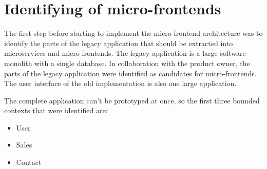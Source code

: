 \section{Identifying of micro-frontends}\label{section:applied-methods:identification-micro-frontends}

The first step before starting to implement the micro-frontend architecture was to identify the parts of the legacy application that should be extracted into microservices and micro-frontends. The legacy application is a large software monolith with a single database. In collaboration with the product owner, the parts of the legacy application were identified as candidates for micro-frontends. The user interface of the old implementation is also one large application.

\bigskip

\noindent The complete application can't be prototyped at once, so the first three bounded contexts that were identified are:

\begin{itemize}
  \item User
  \item Sales
  \item Contact
\end{itemize}